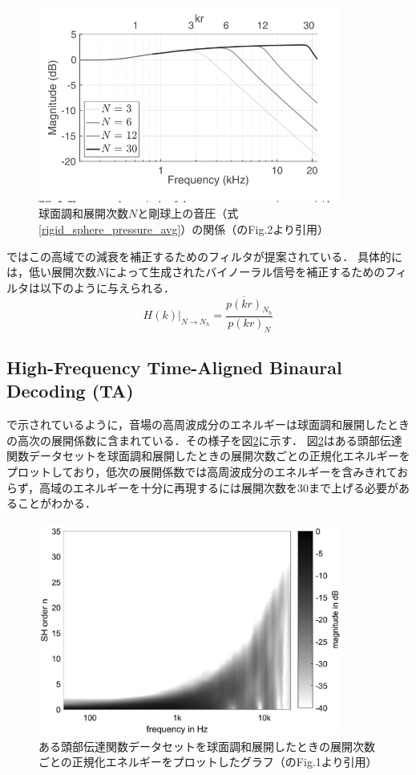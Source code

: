 \documentclass[a4paper]{jsarticle}
\begin{document}
\begin{figure}[H]
    \centering
    \includegraphics[clip,width=10cm]{high_freq_rolloff.png}
    \caption{球面調和展開次数$N$と剛球上の音圧（式\ref{rigid_sphere_pressure_avg}）の関係（\cite{Ben-Hur2017-gm}のFig.2より引用）}
    \label{high_freq_rolloff}
\end{figure}

\cite{Sheaffer2014-bo}ではこの高域での減衰を補正するためのフィルタが提案されている．
具体的には，低い展開次数$N$によって生成されたバイノーラル信号を補正するためのフィルタは以下のように与えられる．
$$
    \left.H(k)\right|_{N \rightarrow N_{h}}=\frac{\overline{p(k r)}_{N_{h}}}{p(k r)_{N}}
$$

\subsection{High-Frequency Time-Aligned Binaural Decoding
    (TA)\cite{Schorkhuber2018-ql,Zaunschirm2018-mn}}
\cite{Zaunschirm2018-mn}で示されているように，音場の高周波成分のエネルギーは球面調和展開したときの高次の展開係数に含まれている．その様子を図\ref{high_order_energy}に示す．
図\ref{high_order_energy}はある頭部伝達関数データセットを球面調和展開したときの展開次数ごとの正規化エネルギーをプロットしており，低次の展開係数では高周波成分のエネルギーを含みきれておらず，高域のエネルギーを十分に再現するには展開次数を30まで上げる必要があることがわかる．

\begin{figure}[H]
    \centering
    \includegraphics[clip,width=10cm]{./high_order_energy.png}
    \caption{ある頭部伝達関数データセットを球面調和展開したときの展開次数ごとの正規化エネルギーをプロットしたグラフ（\cite{Zaunschirm2018-mn}のFig.1より引用）}
    \label{high_order_energy}
\end{figure}
\end{document}
